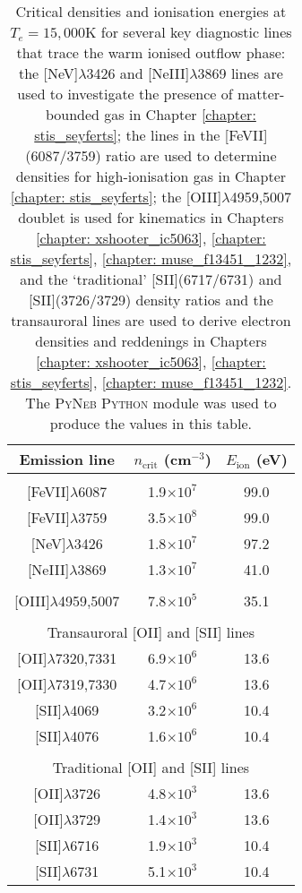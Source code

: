 \begin{table}[ht!]
    \centering
    \renewcommand{\arraystretch}{1.2}
    \begin{tabular}{ccc}
    Emission line & $n_\mathrm{crit}$ (cm$^{-3}$) & $E_\mathrm{ion}$ (eV) \\ \hline
        &   &   \\
    {[}FeVII{]}$\lambda$6087 & 1.9$\times10^7$ & 99.0 \\  
    {[}FeVII{]}$\lambda$3759 & 3.5$\times10^8$ & 99.0 \\
    {[}NeV{]}$\lambda$3426 & 1.8$\times10^7$ & 97.2 \\  
    {[}NeIII{]}$\lambda$3869 & 1.3$\times10^7$  & 41.0 \\
        &   &   \\
    {[}OIII{]}$\lambda$4959,5007 & 7.8$\times10^5$ & 35.1 \\
        &   &   \\
    \multicolumn{3}{c}{Transauroral  {[}OII{]} and  {[}SII{]} lines} \\
    {[}OII{]}$\lambda$7320,7331 & 6.9$\times10^6$ & 13.6 \\
    {[}OII{]}$\lambda$7319,7330 & 4.7$\times10^6$ & 13.6 \\
    {[}SII{]}$\lambda$4069 & 3.2$\times10^6$ & 10.4 \\
    {[}SII{]}$\lambda$4076 & 1.6$\times10^6$ & 10.4 \\
        &   &   \\
    \multicolumn{3}{c}{Traditional  {[}OII{]} and  {[}SII{]} lines} \\
    {[}OII{]}$\lambda$3726 & 4.8$\times10^3$ & 13.6 \\
    {[}OII{]}$\lambda$3729 & 1.4$\times10^3$ & 13.6 \\ 
    {[}SII{]}$\lambda$6716 & 1.9$\times10^3$ & 10.4 \\
    {[}SII{]}$\lambda$6731 & 5.1$\times10^3$ & 10.4 \\
    \end{tabular}
    \caption[Critical densities and ionisation energies at $T_{e}=15,000$\;K for several key diagnostic lines that trace the warm ionised outflow phase.]{Critical densities and ionisation energies at $T_{e}=15,000$\;K for several key diagnostic lines that trace the warm ionised outflow phase: the [NeV]$\lambda$3426 and [NeIII]$\lambda$3869 lines are used to investigate the presence of matter-bounded gas in Chapter \ref{chapter: stis_seyferts}; the lines in the [FeVII](6087/3759) ratio are used to determine densities for high-ionisation gas in Chapter \ref{chapter: stis_seyferts}; the [OIII]$\lambda$4959,5007 doublet is used for kinematics in Chapters \ref{chapter: xshooter_ic5063}, \ref{chapter: stis_seyferts}, \ref{chapter: muse_f13451_1232}, and the `traditional' [SII](6717/6731) and [SII](3726/3729) density ratios and the transauroral lines are used to derive electron densities and reddenings in Chapters \ref{chapter: xshooter_ic5063}, \ref{chapter: stis_seyferts}, \ref{chapter: muse_f13451_1232}. The \textsc{PyNeb Python} module was used to produce the values in this table.}
    \label{tab: critical_densities}
\end{table}
